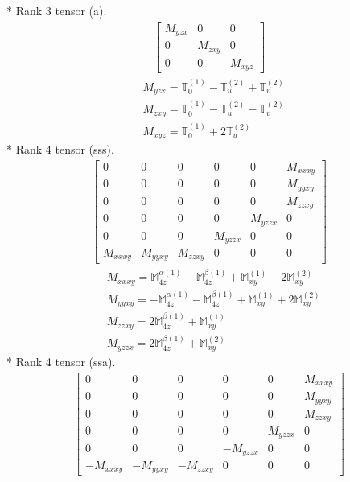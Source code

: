 \documentclass[fleqn,8pt,landscape]{jsarticle}
\begin{document}
* Rank 3 tensor (a).
\begin{align*}
\begin{bmatrix} M_{yzx} & 0 & 0 \\ 0 & M_{zxy} & 0 \\ 0 & 0 & M_{xyz} \end{bmatrix}
\end{align*}
\begin{align*}
& M_{yzx} = \mathbb{T}_{0}^{(1)} - \mathbb{T}_{u}^{(2)} + \mathbb{T}_{v}^{(2)} \\
& M_{zxy} = \mathbb{T}_{0}^{(1)} - \mathbb{T}_{u}^{(2)} - \mathbb{T}_{v}^{(2)} \\
& M_{xyz} = \mathbb{T}_{0}^{(1)} + 2 \mathbb{T}_{u}^{(2)}
\end{align*}
* Rank 4 tensor (sss).
\begin{align*}
\begin{bmatrix} 0 & 0 & 0 & 0 & 0 & M_{xxxy} \\ 0 & 0 & 0 & 0 & 0 & M_{yyxy} \\ 0 & 0 & 0 & 0 & 0 & M_{zzxy} \\ 0 & 0 & 0 & 0 & M_{yzzx} & 0 \\ 0 & 0 & 0 & M_{yzzx} & 0 & 0 \\ M_{xxxy} & M_{yyxy} & M_{zzxy} & 0 & 0 & 0 \end{bmatrix}
\end{align*}
\begin{align*}
& M_{xxxy} = \mathbb{M}_{4z}^{\alpha(1)} - \mathbb{M}_{4z}^{\beta(1)} + \mathbb{M}_{xy}^{(1)} + 2 \mathbb{M}_{xy}^{(2)} \\
& M_{yyxy} = - \mathbb{M}_{4z}^{\alpha(1)} - \mathbb{M}_{4z}^{\beta(1)} + \mathbb{M}_{xy}^{(1)} + 2 \mathbb{M}_{xy}^{(2)} \\
& M_{zzxy} = 2 \mathbb{M}_{4z}^{\beta(1)} + \mathbb{M}_{xy}^{(1)} \\
& M_{yzzx} = 2 \mathbb{M}_{4z}^{\beta(1)} + \mathbb{M}_{xy}^{(2)}
\end{align*}
* Rank 4 tensor (ssa).
\begin{align*}
\begin{bmatrix} 0 & 0 & 0 & 0 & 0 & M_{xxxy} \\ 0 & 0 & 0 & 0 & 0 & M_{yyxy} \\ 0 & 0 & 0 & 0 & 0 & M_{zzxy} \\ 0 & 0 & 0 & 0 & M_{yzzx} & 0 \\ 0 & 0 & 0 & - M_{yzzx} & 0 & 0 \\ - M_{xxxy} & - M_{yyxy} & - M_{zzxy} & 0 & 0 & 0 \end{bmatrix}
\end{align*}
\end{document}
